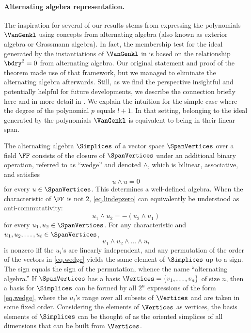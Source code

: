 \paragraph{Alternating algebra representation.}
The inspiration for several of our results stems from expressing the
polynomials $\VanGenkl$ using concepts from alternating algebra
(also known as exterior algebra or Grassmann algebra).
In fact, the membership test for the ideal generated by the instantiations of $\VanGenkl$ in  is based on the relationship \(\bdry^2=0\) from alternating algebra.
Our original statement and proof of the theorem made use of that framework,
but we managed to eliminate the alternating algebra afterwards.
Still, as we find the perspective insightful and potentially helpful for
future developments,
we describe the connection briefly here
and in more detail in .
We explain the intuition for the
simple case where the degree of the polynomial $p$ equals $l+1$.
In that setting, belonging to the ideal generated by the polynomials
$\VanGenkl$  is equivalent to being in their linear span.

The alternating algebra $\Simplices$ of a vector space $\SpanVertices$ over a field $\FF$ consists
of the closure of $\SpanVertices$ under an additional binary operation,
referred to as ``wedge'' and denoted $\wedge$,
which is bilinear, associative, and satisfies
\begin{equation}\label{eq.lindepzero}
  u \wedge u = 0
\end{equation}
for every $u \in \SpanVertices$.
This determines a well-defined algebra.
When the characteristic of $\FF$ is not 2,
\eqref{eq.lindepzero} can equivalently be understood as anti-commutativity:
\begin{equation}\label{eq.anti-commute}
  u_1 \wedge u_2 = -(u_2 \wedge u_1)
\end{equation}
for every $u_1, u_2\in \SpanVertices$.
For any characteristic and $u_1, u_2, \dots, u_t \in \SpanVertices$,
\begin{equation} \label{eq.wedge}
  u_1 \wedge u_2 \wedge \dots \wedge u_t
\end{equation}
is nonzero iff the $u_i$'s are linearly independent,
and any permutation of the order of the vectors in \eqref{eq.wedge} yields the
same element of $\Simplices$ up to a sign.
The sign equals the sign of the permutation,
whence the name ``alternating algebra.''
If $\SpanVertices$ has a basis $\Vertices=\{v_1,\dots,v_n\}$ of size $n$,
then a basis for $\Simplices$ can be formed by all $2^n$ expressions of the form
\eqref{eq.wedge},
where the $u_i$'s range over all subsets of $\Vertices$
and are taken in some fixed order.
Considering the elements of $\Vertices$ as vertices,
the basis elements of $\Simplices$ can be thought of as the oriented simplices of all
dimensions that can be built from $\Vertices$.

